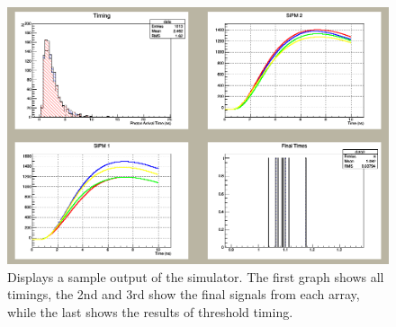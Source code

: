 \documentclass[paper=a4, fontsize=11pt]{scrartcl}
\numberwithin{equation}{section}		%
\numberwithin{figure}{section}			%
\numberwithin{table}{section}				%
\begin{document}
 
 \begin{figure}[H]
\centering
\includegraphics[width=0.80\linewidth]{simd1}
\caption{Displays a sample output of the simulator. The first graph shows all timings, the 2nd and 3rd show the final signals from each array, while the last shows the results of threshold timing.}
\label{simd1}
\end{figure} 
\newpage
\newpage
\newpage





\end{document}

